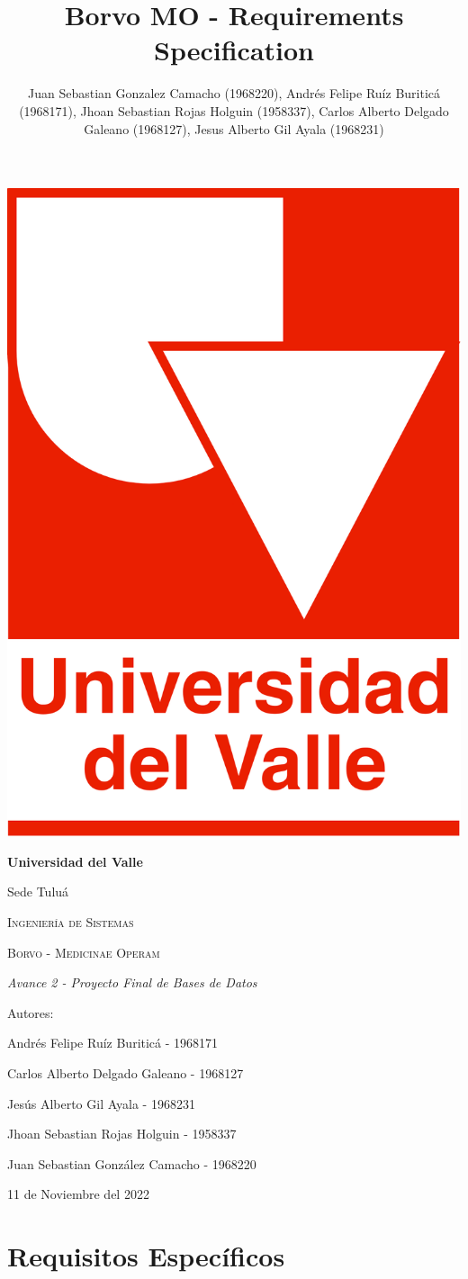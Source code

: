 \documentclass[12pt,a4paper]{article}
\author{Juan Sebastian Gonzalez Camacho (1968220), Andrés Felipe Ruíz Buriticá (1968171), Jhoan Sebastian Rojas Holguin (1958337), Carlos Alberto Delgado Galeano (1968127), Jesus Alberto Gil Ayala (1968231)}
\title{Borvo MO - Requirements Specification}
\begin{document}
\begin{titlepage}
\centering
{\includegraphics[width=0.18 \textwidth]{logo.png} \par}
\vfill
{\bfseries\LARGE Universidad del Valle\par}
{\Large Sede Tuluá\par}
\vfill
{\scshape\Large Ingeniería de Sistemas \par}
\vfill
{\scshape\Huge Borvo - Medicinae Operam \par}
\vfill
{\itshape\Large Avance 2 - Proyecto Final de Bases de Datos\par}
\vfill
{\Large Autores: \par}
{\Large Andrés Felipe Ruíz Buriticá - 1968171 \par}
{\Large Carlos Alberto Delgado Galeano - 1968127 \par}
{\Large Jesús Alberto Gil Ayala - 1968231 \par}
{\Large Jhoan Sebastian Rojas Holguin - 1958337 \par}
{\Large Juan Sebastian González Camacho - 1968220 \par}
\vfill
{\Large 11 de Noviembre del 2022 \par}
\end{titlepage}
\tableofcontents
\newpage
\section{Requisitos Específicos}
\end{document}
